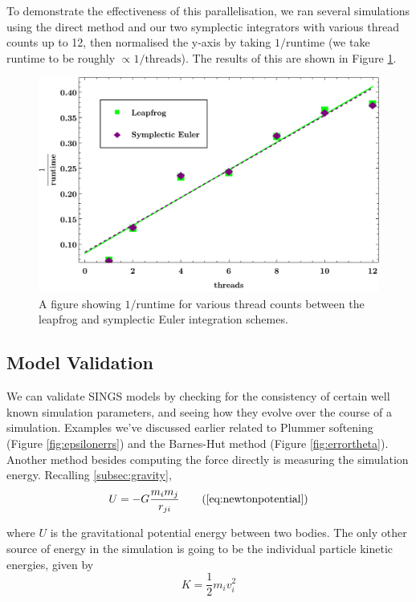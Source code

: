 \documentclass[12pt, twoside, letterpaper]{article}
\begin{document}
To demonstrate the effectiveness of this parallelisation, we ran several simulations using the direct method and our two symplectic integrators with various thread counts up to 12, then normalised the y-axis by taking $1/\text{runtime}$ (we take runtime to be roughly $\propto 1/\text{threads}$). The results of this are shown in Figure \ref{fig:runtimethreads}.
\begin{figure}[h]
\caption{A figure showing $1/\text{runtime}$ for various thread counts between the leapfrog and symplectic Euler integration schemes.}
\centerline{\includegraphics[width=.75\textwidth]{threadsruntime.pdf}}
\label{fig:runtimethreads}
\end{figure}


\subsection{Model Validation} \label{subsec:validation}
We can validate SINGS models by checking for the consistency of certain well known simulation parameters, and seeing how they evolve over the course of a simulation. Examples we've discussed earlier related to Plummer softening (Figure \ref{fig:epsilonerrs}) and the Barnes-Hut method (Figure \ref{fig:errortheta}). Another method besides computing the force directly is measuring the simulation energy. Recalling \ref{subsec:gravity}, 
\begin{equation}
	U = -G \dfrac{m_im_j}{r_{ji}}
	\tag{\ref{eq:newtonpotential}}
\end{equation}

\noindent where $U$ is the gravitational potential energy between two bodies. The only other source of energy in the simulation is going to be the individual particle kinetic energies, given by
\begin{equation} \label{eq:ke}
	K = \frac{1}{2}m_i v_i^2
\end{equation}
\end{document}
